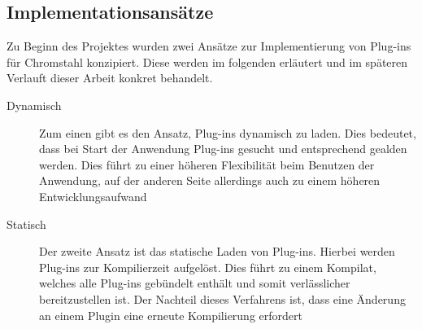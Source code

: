 \subsection{Implementationsansätze}
Zu Beginn des Projektes wurden zwei Ansätze zur Implementierung von Plug-ins für
Chromstahl konzipiert. Diese werden im folgenden erläutert und im späteren
Verlauft dieser Arbeit konkret behandelt.
\begin{description}
\item[Dynamisch]{Zum einen gibt es den Ansatz, Plug-ins dynamisch zu laden. Dies
  bedeutet, dass bei Start der Anwendung Plug-ins gesucht und entsprechend
  gealden werden. Dies führt zu einer höheren Flexibilität beim Benutzen der
  Anwendung, auf der anderen Seite allerdings auch zu einem höheren Entwicklungsaufwand}
\item[Statisch]{Der zweite Ansatz ist das statische Laden von Plug-ins. Hierbei
    werden Plug-ins zur Kompilierzeit aufgelöst. Dies führt zu einem Kompilat,
    welches alle Plug-ins gebündelt enthält und somit verlässlicher
    bereitzustellen ist. Der Nachteil dieses Verfahrens ist, dass eine Änderung
    an einem Plugin eine erneute Kompilierung erfordert}
\end{description}
